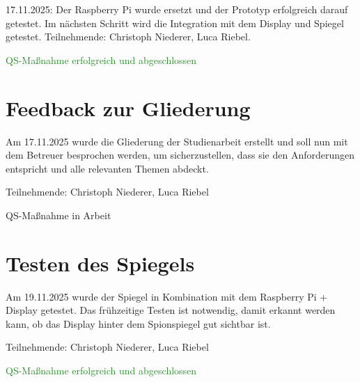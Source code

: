 17.11.2025: Der Raspberry Pi wurde ersetzt und der Prototyp erfolgreich darauf getestet. Im nächsten Schritt wird die Integration mit dem Display und Spiegel getestet.
Teilnehmende: Christoph Niederer, Luca Riebel.

{\textcolor{ForestGreen}{QS-Maßnahme erfolgreich und abgeschlossen}}

\section{Feedback zur Gliederung}
Am 17.11.2025 wurde die Gliederung der Studienarbeit erstellt und soll nun mit dem Betreuer besprochen werden, um sicherzustellen, dass sie den Anforderungen entspricht und alle relevanten Themen abdeckt.

Teilnehmende: Christoph Niederer, Luca Riebel

{\textcolor{yellow!80!brown}{QS-Maßnahme in Arbeit}}

\section{Testen des Spiegels}
Am 19.11.2025 wurde der Spiegel in Kombination mit dem Raspberry Pi + Display getestet. Das frühzeitige Testen ist notwendig, damit erkannt werden kann, ob das Display hinter dem Spionspiegel gut sichtbar ist.

Teilnehmende: Christoph Niederer, Luca Riebel

{\textcolor{ForestGreen}{QS-Maßnahme erfolgreich und abgeschlossen}}

